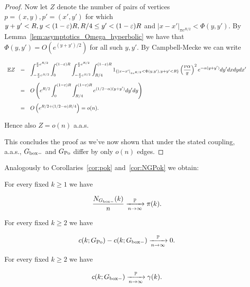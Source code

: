 \begin{proof}
Now let $Z$ denote the number of pairs of vertices $p = (x,y), p'=(x',y')$
for which $y+y'<R, y < (1-\varepsilon)R, R/4 \leq y' < (1-\varepsilon)R$ and $|x-x'|_{\pi e^{R/2}} < \Phi(y,y')$.
By Lemma~\ref{lem:asymptotics_Omega_hyperbolic} we have that $\Phi(y,y') = O( e^{(y+y')/2} )$ 
for all such $y,y'$.
By Campbell-Mecke we can write

$$ \begin{array}{rcl} 
{\mathbb E} Z 
& = & \displaystyle
\int_{-\frac{\pi}{2}e^{R/2}}^{\frac{\pi}{2}e^{R/2}}\int_0^{(1-\varepsilon)R}
\int_{-\frac{\pi}{2}e^{R/2}}^{\frac{\pi}{2}e^{R/2}}\int_{R/4}^{(1-\varepsilon)R} 
1_{\{|x-x'|_{\pi e^{R/2}}<\Phi(y,y'), y+y'<R\}}\left(\frac{\nu\alpha}{\pi}\right)^2 e^{-\alpha(y+y')}dy'dxdydx' \\[4ex]
& = & \displaystyle
O\left( e^{R/2} \int_0^{(1-\varepsilon)R} \int_{R/4}^{(1-\varepsilon)R} e^{(1/2-\alpha)(y+y')} dy'dy \right) \\[4ex]
& = & \displaystyle
O\left( e^{R/2 + (1/2-\alpha) R/4} \right) = o(n).
\end{array} $$ 

\noindent
Hence also $Z = o(n)$ a.a.s.

This concludes the proof as we've now shown that under the stated coupling, a.a.s., $G_{\mathrm{box}-}$ and $G_{{\mathrm{Po}}}$ differ by only $o(n)$ edges.
\end{proof}

Analogously to Corollaries~\ref{cor:pok} and~\ref{cor:NGPok} we obtain:

\begin{corollary}\label{cor:GPoHdegseq}
For every fixed $k \geq 1$ we have 

$$\frac{N_{G_{\mathrm{box}-}}(k)}{n} \xrightarrow[n\to\infty]{\mathbb{P}} {\pi}(k). $$

\end{corollary}

\begin{corollary}\label{cor:GPoGboxH}
For every fixed $k\geq 2$ we have 

$$c(k;G_{{\mathrm{Po}}}) - c(k;G_{\mathrm{box}-}) \xrightarrow[n \rightarrow \infty]{\mathbb{P}} 0. $$

\end{corollary}


\begin{lemma}\label{lem:ckGboxH} 
For every fixed $k\geq 2$ we have

 $$ c(k;G_{\mathrm{box}-}) \xrightarrow[n \rightarrow \infty]{\mathbb{P}}  \gamma(k). $$

 \end{lemma}

